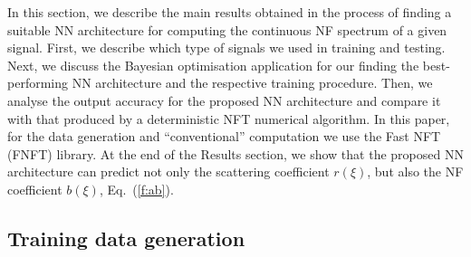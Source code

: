 In this section, we describe the main results obtained in the process of finding a suitable NN architecture for computing the continuous NF spectrum of a given signal. 
First, we describe which type of signals we used in training and testing. Next, we discuss the Bayesian optimisation application for our finding the best-performing NN architecture and the respective training procedure. 
Then, we analyse the output accuracy for the proposed NN architecture and compare it with that produced by a deterministic NFT numerical algorithm.
In this paper, for the data generation and ``conventional'' computation we use the Fast NFT (FNFT) library\cite{FNFT2018}.
At the end of the Results section, we show that the proposed NN architecture can predict not only the scattering coefficient $r(\xi)$, but also the NF coefficient $b(\xi)$, Eq.~(\ref{f:ab}).



\subsection*{Training data generation}

